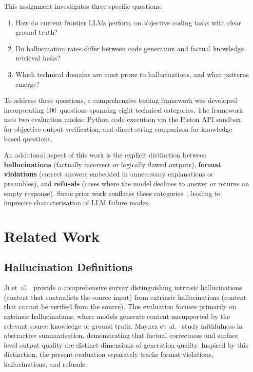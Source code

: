 \documentclass[12pt,a4paper]{article}
\begin{document}
This assignment investigates three specific questions:
\begin{enumerate}[leftmargin=*]
  \item How do current frontier LLMs perform on objective coding tasks with clear ground truth?
  \item Do hallucination rates differ between code generation and factual knowledge retrieval tasks?
  \item Which technical domains are most prone to hallucinations, and what patterns emerge?
\end{enumerate}

To address these questions, a comprehensive testing framework was developed incorporating 100~questions spanning eight technical categories. The framework uses two evaluation modes: Python code execution via the Piston API sandbox for objective output verification, and direct string comparison for knowledge based questions.

An additional aspect of this work is the explicit distinction between \textbf{hallucinations} (factually incorrect or logically flawed outputs), \textbf{format violations} (correct answers embedded in unnecessary explanations or preambles), and \textbf{refusals} (cases where the model declines to answer or returns an empty response). Some prior work conflates these categories~\cite{ji2023survey}, leading to imprecise characterisation of LLM failure modes.

\section{Related Work}

\subsection{Hallucination Definitions}

Ji et~al.~\cite{ji2023survey} provide a comprehensive survey distinguishing intrinsic hallucinations (content that contradicts the source input) from extrinsic hallucinations (content that cannot be verified from the source). This evaluation focuses primarily on extrinsic hallucinations, where models generate content unsupported by the relevant source knowledge or ground truth. Maynez et~al.~\cite{maynez2020faithfulness} study faithfulness in abstractive summarisation, demonstrating that factual correctness and surface level output quality are distinct dimensions of generation quality. Inspired by this distinction, the present evaluation separately tracks format violations, hallucinations, and refusals.
\end{document}
